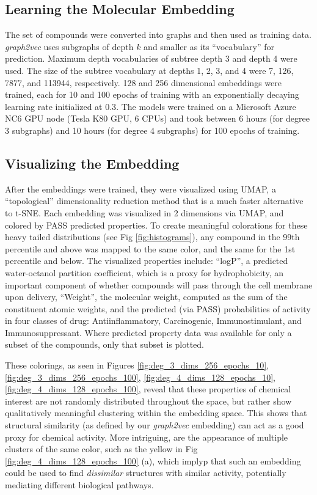 \subsection{Learning the Molecular Embedding}

The set of compounds were converted into graphs and then used as training data. \textit{graph2vec} uses subgraphs of depth $k$ and smaller as its ``vocabulary'' for prediction. Maximum depth vocabularies of subtree depth 3 and depth 4 were used. The size of the subtree vocabulary at depths 1, 2, 3, and 4 were 7, 126, 7877, and 113944, respectively. 128 and 256 dimensional embeddings were trained, each for 10 and 100 epochs of training with an exponentially decaying learning rate initialized at $0.3$. The models were trained on a Microsoft Azure NC6 GPU node (Tesla K80 GPU, 6 CPUs) and took between 6 hours (for degree 3 subgraphs) and 10 hours (for degree 4 subgraphs) for 100 epochs of training.

\subsection{Visualizing the Embedding}

After the embeddings were trained, they were visualized using UMAP, a ``topological'' dimensionality reduction method that is a much faster alternative to t-SNE\citet{McInnes2018}. Each embedding was visualized in 2 dimensions via UMAP, and colored by PASS predicted properties. To create meaningful colorations for these heavy tailed distributions (see Fig \ref{fig:histograms}), any compound in the 99th percentile and above was mapped to the same color, and the same for the 1st percentile and below. The visualized properties include: ``logP'', a predicted water-octanol partition coefficient, which is a proxy for hydrophobicity, an important component of whether compounds will pass through the cell membrane upon delivery, ``Weight'', the molecular weight, computed as the sum of the constituent atomic weights, and the predicted (via PASS) probabilities of activity in four classes of drug: Antiinflammatory, Carcinogenic, Immunostimulant, and Immunosuppressant. Where predicted property data was available for only a subset of the compounds, only that subset is plotted.

These colorings, as seen in Figures \ref{fig:deg_3_dims_256_epochs_10}, \ref{fig:deg_3_dims_256_epochs_100}, \ref{fig:deg_4_dims_128_epochs_10}, \ref{fig:deg_4_dims_128_epochs_100}, reveal that these properties of chemical interest are not randomly distributed throughout the space, but rather show qualitatively meaningful clustering within the embedding space. This shows that structural similarity (as defined by our \textit{graph2vec} embedding) can act as a good proxy for chemical activity. More intriguing, are the appearance of multiple clusters of the same color, such as the yellow in Fig \ref{fig:deg_4_dims_128_epochs_100} (a), which implyp that such an embedding could be used to find \textit{dissimilar} structures with similar activity, potentially mediating different biological pathways.

